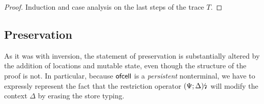 \begin{proof}
Induction and case analysis on the last steps of the trace $T$. 
\end{proof}





\subsection{Preservation}

As it was with inversion, the statement of preservation is
substantially altered by the addition of locations and mutable state,
even though the structure of the proof is not.  In particular, because
${\sf ofcell}$ is a {\it persistent} nonterminal, we have to expressly
represent the fact that the restriction operator ${(\Psi;
  \Delta)}{\mbox{\lightning}}_{}$ will modify the context $\Delta$ by erasing the store
typing.

